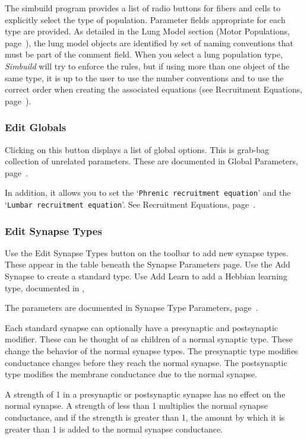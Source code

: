 \documentclass[12pt,openany,oneside]{book}
\newcommand{\tisamp}[1]{`\texttt{#1}'}
\newcommand{\tiref}[1]{#1, page~\pageref{#1}}
\newcommand{\prog}[1]{\textit{{#1}}}
\begin{document}
The simbuild program provides a list of radio buttons for fibers and cells
to explicitly select the type of population. Parameter fields appropriate
for each type are provided. As detailed in the Lung Model section
(\tiref{Motor Populations}), the lung model objects are identified by set
of naming conventions that must be part of the comment field. When you
select a lung population type, \prog{Simbuild} will try to enforce the
rules, but if using more than one object of the same type, it is up to the
user to use the number conventions and to use the correct order when
creating the associated equations (see \tiref{Recruitment Equations}).


\subsubsection{Edit Globals}
Clicking on this button displays a list of global options. This is 
grab-bag collection of unrelated parameters. These are documented in
\tiref{Global Parameters}.

In addition, it allows you to set the \tisamp{Phrenic recruitment equation}
and the \tisamp{Lumbar recruitment equation}. See \tiref{Recruitment Equations}.

\subsubsection{Edit Synapse Types}

Use the Edit Synapse Types button on the toolbar to add new synapse types.
These appear in the table beneath the Synapse Parameters page. Use the
Add Synapse to create a standard type. Use Add Learn to add a Hebbian
learning type, documented in \citet{hebb1949organization},

The parameters are documented in
\tiref{Synapse Type Parameters}.

Each standard synapse can optionally have a presynaptic and postsynaptic
modifier. These can be thought of as children of a normal synaptic type.
These change the behavior of the normal synapse types. The presynaptic
type modifies conductance changes before they reach the normal synapse.
The postsynaptic type modifies the membrane conductance due to the normal
synapse.

A strength of 1 in a presynaptic or postsynaptic synapse has no effect
on the normal synapse. A strength of less than 1 multiplies the normal
synapse conductance, and if the strength is greater than 1, the amount by
which it is greater than 1 is added to the normal synapse conductance.
\end{document}
